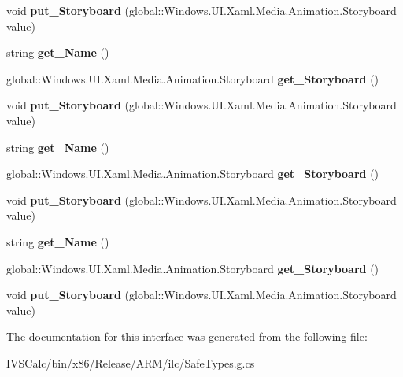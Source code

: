 \begin{DoxyCompactItemize}
void {\bfseries put\+\_\+\+Storyboard} (global\+::\+Windows.\+U\+I.\+Xaml.\+Media.\+Animation.\+Storyboard value)
\item 
\mbox{\label{interface_windows_1_1_u_i_1_1_xaml_1_1_i_visual_state_a72d7beda82f744c5a862ea0e03df818f}} 
string {\bfseries get\+\_\+\+Name} ()
\item 
\mbox{\label{interface_windows_1_1_u_i_1_1_xaml_1_1_i_visual_state_afc79a456f54434e91a54542427345efa}} 
global\+::\+Windows.\+U\+I.\+Xaml.\+Media.\+Animation.\+Storyboard {\bfseries get\+\_\+\+Storyboard} ()
\item 
\mbox{\label{interface_windows_1_1_u_i_1_1_xaml_1_1_i_visual_state_a654382a0a087af034454001b752d80df}} 
void {\bfseries put\+\_\+\+Storyboard} (global\+::\+Windows.\+U\+I.\+Xaml.\+Media.\+Animation.\+Storyboard value)
\item 
\mbox{\label{interface_windows_1_1_u_i_1_1_xaml_1_1_i_visual_state_a72d7beda82f744c5a862ea0e03df818f}} 
string {\bfseries get\+\_\+\+Name} ()
\item 
\mbox{\label{interface_windows_1_1_u_i_1_1_xaml_1_1_i_visual_state_afc79a456f54434e91a54542427345efa}} 
global\+::\+Windows.\+U\+I.\+Xaml.\+Media.\+Animation.\+Storyboard {\bfseries get\+\_\+\+Storyboard} ()
\item 
\mbox{\label{interface_windows_1_1_u_i_1_1_xaml_1_1_i_visual_state_a654382a0a087af034454001b752d80df}} 
void {\bfseries put\+\_\+\+Storyboard} (global\+::\+Windows.\+U\+I.\+Xaml.\+Media.\+Animation.\+Storyboard value)
\item 
\mbox{\label{interface_windows_1_1_u_i_1_1_xaml_1_1_i_visual_state_a72d7beda82f744c5a862ea0e03df818f}} 
string {\bfseries get\+\_\+\+Name} ()
\item 
\mbox{\label{interface_windows_1_1_u_i_1_1_xaml_1_1_i_visual_state_afc79a456f54434e91a54542427345efa}} 
global\+::\+Windows.\+U\+I.\+Xaml.\+Media.\+Animation.\+Storyboard {\bfseries get\+\_\+\+Storyboard} ()
\item 
\mbox{\label{interface_windows_1_1_u_i_1_1_xaml_1_1_i_visual_state_a654382a0a087af034454001b752d80df}} 
void {\bfseries put\+\_\+\+Storyboard} (global\+::\+Windows.\+U\+I.\+Xaml.\+Media.\+Animation.\+Storyboard value)
\end{DoxyCompactItemize}


The documentation for this interface was generated from the following file\+:\begin{DoxyCompactItemize}
\item 
I\+V\+S\+Calc/bin/x86/\+Release/\+A\+R\+M/ilc/Safe\+Types.\+g.\+cs\end{DoxyCompactItemize}
